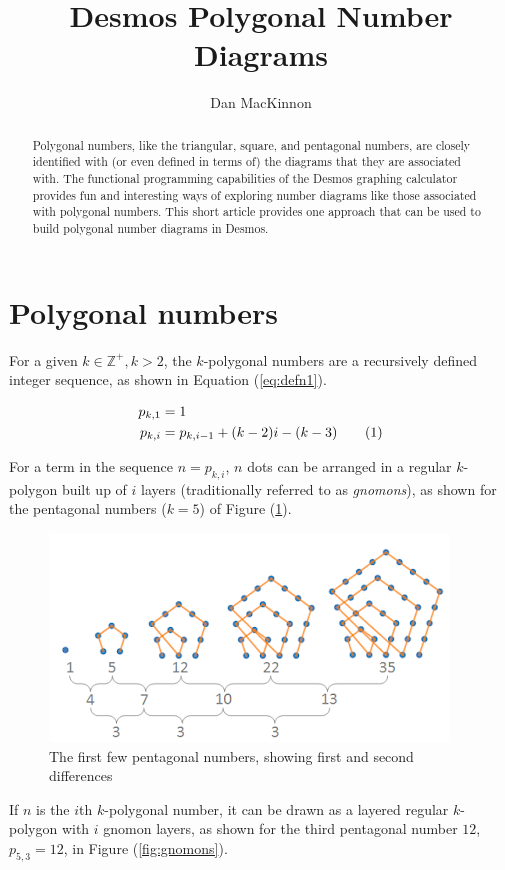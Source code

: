 \documentclass[notitlepage]{report}
\title{Desmos Polygonal Number Diagrams}
\author{Dan MacKinnon}
\newcommand\numberthis{\addtocounter{equation}{1}\tag{\theequation}}
\begin{document}
\maketitle
\begin{abstract}
\noindent
Polygonal numbers, like the triangular, square, and pentagonal numbers, are closely identified with (or even defined in terms of) the diagrams that they are associated with. The functional programming capabilities of the Desmos graphing calculator provides fun and interesting ways of exploring number diagrams like those associated with polygonal numbers. This short article provides one approach that can be used to build polygonal number diagrams in Desmos.  
\end{abstract}

\section*{Polygonal numbers}
For a given $k \in \mathbb{Z}^+, k>2$, the $k$-polygonal numbers\cite{conway1998book} are a recursively defined integer sequence, as shown in Equation (\ref{eq:defn1}). 

\begin{align*}
    p_{k, 1} &= 1 \\
    p_{k,i} &= p_{k,i-1} + (k-2)i - (k-3)
    \numberthis
    \label{eq:defn1}
\end{align*}

For a term in the sequence $n = p_{k,i}$, $n$ dots can be arranged in a regular $k$-polygon built up of $i$ layers (traditionally referred to as \textit{gnomons}), as shown for the pentagonal numbers ($k=5$) of Figure (\ref{fig:pentagonals}). 

\begin{figure}[!htb]
    \centering
    \includegraphics[width=0.5\linewidth]{pentagonal_numbers.PNG}
    \caption{The first few pentagonal numbers, showing first and second differences}
    \label{fig:pentagonals}
\end{figure}

If $n$ is the $i$th $k$-polygonal number, it can be drawn as a layered regular $k$-polygon with $i$ gnomon layers, as shown for the third pentagonal number $12$, $p_{5,3}=12$, in Figure (\ref{fig:gnomons}).
\end{document}
